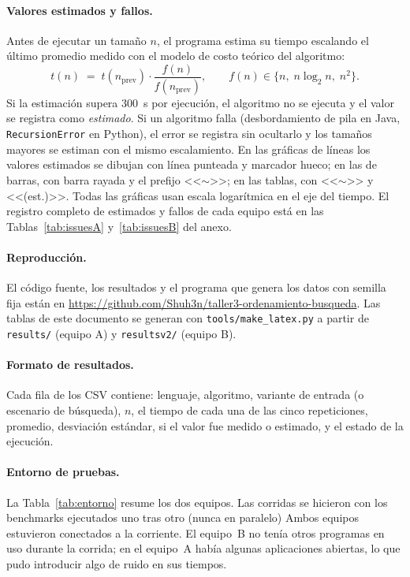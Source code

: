 \documentclass[11pt,a4paper]{article}
\newcommand{\code}[1]{\texttt{#1}}
\begin{document}
\paragraph{Valores estimados y fallos.} Antes de ejecutar un tama\~no $n$, el programa estima su tiempo
escalando el \'ultimo promedio medido con el modelo de costo te\'orico del algoritmo:
\begin{equation}
  t(n)\;=\;t(n_{\text{prev}})\cdot\frac{f(n)}{f(n_{\text{prev}})},
  \qquad f(n)\in\{n,\; n\log_2 n,\; n^2\}.\label{eq:estimacion}
\end{equation}
Si la estimaci\'on supera 300~s por ejecuci\'on, el algoritmo no se ejecuta y el valor se registra como
\emph{estimado}. Si un algoritmo falla (desbordamiento de pila en Java, \code{RecursionError} en Python), el
error se registra sin ocultarlo y los tama\~nos mayores se estiman con el mismo escalamiento. En las gr\'aficas
de l\'ineas los valores estimados se dibujan con l\'inea punteada y marcador hueco; en las de barras, con barra
rayada y el prefijo <<$\sim$>>; en las tablas, con <<$\sim$>> y <<(est.)>>. Todas las gr\'aficas usan escala
logar\'itmica en el eje del tiempo. El registro completo de estimados y fallos de cada equipo est\'a en las
Tablas~\ref{tab:issuesA} y~\ref{tab:issuesB} del anexo.

\paragraph{Reproducci\'on.} El c\'odigo fuente, los resultados y el programa que genera los datos con semilla fija
est\'an en \url{https://github.com/Shuh3n/taller3-ordenamiento-busqueda}. Las tablas de este documento se
generan con \code{tools/make\_latex.py} a partir de \code{results/} (equipo A) y \code{resultsv2/} (equipo B).

\paragraph{Formato de resultados.} Cada fila de los CSV contiene: lenguaje, algoritmo, variante de entrada (o
escenario de b\'usqueda), $n$, el tiempo de cada una de las cinco repeticiones, promedio, desviaci\'on
est\'andar, si el valor fue medido o estimado, y el estado de la ejecuci\'on.

\paragraph{Entorno de pruebas.}\label{par:entorno} La Tabla~\ref{tab:entorno} resume los dos equipos. Las
corridas se hicieron con los benchmarks ejecutados uno tras otro (nunca en paralelo)
Ambos equipos estuvieron conectados a la corriente. El equipo~B no ten\'ia otros programas en uso durante la corrida; en el equipo~A hab\'ia algunas aplicaciones abiertas, lo que pudo introducir algo de ruido en sus tiempos.
\end{document}
